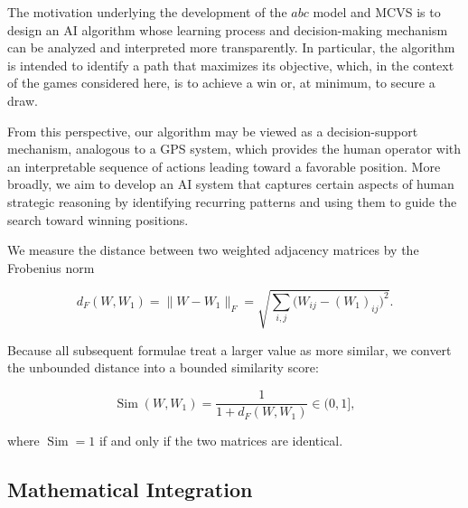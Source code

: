 \documentclass[11pt,a4paper]{article}
\theoremstyle{plain}
\theoremstyle{definition}
\begin{document}
\vspace{0.5em}

The motivation underlying the development of the $abc$ model and MCVS is to design an AI algorithm whose learning process and decision-making mechanism can be analyzed and interpreted more transparently. In particular, the algorithm is intended to identify a path that maximizes its objective, which, in the context of the games considered here, is to achieve a win or, at minimum, to secure a draw.

\vspace{0.5em}

From this perspective, our algorithm may be viewed as a decision-support mechanism, analogous to a GPS system, which provides the human operator with an interpretable sequence of actions leading toward a favorable position. More broadly, we aim to develop an AI system that captures certain aspects of human strategic reasoning by identifying recurring patterns and using them to guide the search toward winning positions.

\vspace{0.5em}

We measure the distance between two weighted adjacency matrices by the Frobenius norm

\vspace{0.5em}

\[
d_F(W, W_1)
=
\|W - W_1\|_F
=
\sqrt{\sum_{i,j}\bigl(W_{ij}-(W_1)_{ij}\bigr)^2}.
\]

\vspace{0.5em}

Because all subsequent formulae treat a larger value as more similar, we convert the unbounded distance into a bounded similarity score:

\vspace{0.5em}

\[
\operatorname{Sim}(W, W_1)
=
\frac{1}{1 + d_F(W, W_1)}
\in (0,1],
\]

\vspace{0.5em}

where \(\operatorname{Sim}=1\) if and only if the two matrices are identical.

\vspace{0.5em}

\subsection{Mathematical Integration}

\vspace{0.5em}
\end{document}
